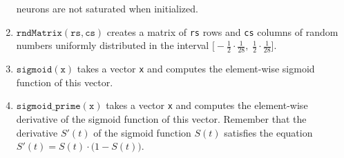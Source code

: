 \begin{enumerate}
      neurons are not saturated when initialized.
\item $\texttt{rndMatrix}(\texttt{rs}, \texttt{cs})$ creates a matrix of \texttt{rs} rows and \texttt{cs} columns of random
      numbers uniformly distributed in the interval
      $\bigl[-\frac{1}{2}\cdot\frac{1}{28},\; \frac{1}{2}\cdot\frac{1}{28}\bigr]$.
\item $\texttt{sigmoid}(\texttt{x})$ takes a vector \texttt{x} and computes the element-wise sigmoid function of
      this vector.
\item $\texttt{sigmoid\_prime}(\texttt{x})$ takes a vector \texttt{x} and computes the element-wise derivative
      of the sigmoid function of this vector.  Remember that the derivative $S'(t)$ of the sigmoid function $S(t)$
      satisfies the equation
      \\[0.2cm]
      \hspace*{1.3cm}
      $S'(t) = S(t) \cdot \bigl(1 - S(t)\bigr)$.
\end{enumerate}

